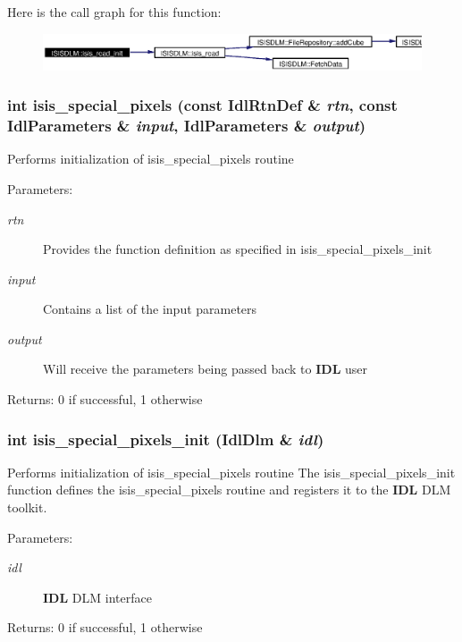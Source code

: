 Here is the call graph for this function:\begin{figure}[H]
\begin{center}
\leavevmode
\includegraphics[width=337pt]{namespaceISISDLM_a26_cgraph}
\end{center}
\end{figure}
\subsubsection{\setlength{\rightskip}{0pt plus 5cm}int isis\_\-special\_\-pixels (const Idl\-Rtn\-Def \& {\em rtn}, const Idl\-Parameters \& {\em input}, Idl\-Parameters \& {\em output})}\label{namespaceISISDLM_a35}


Performs initialization of isis\_\-special\_\-pixels routine \begin{Desc}
\item[Parameters:]
\begin{description}
\item[{\em rtn}]Provides the function definition as specified in isis\_\-special\_\-pixels\_\-init \item[{\em input}]Contains a list of the input parameters \item[{\em output}]Will receive the parameters being passed back to {\bf IDL} user \end{description}
\end{Desc}
\begin{Desc}
\item[Returns:]0 if successful, 1 otherwise \end{Desc}
\subsubsection{\setlength{\rightskip}{0pt plus 5cm}int isis\_\-special\_\-pixels\_\-init (Idl\-Dlm \& {\em idl})}\label{namespaceISISDLM_a34}


Performs initialization of isis\_\-special\_\-pixels routine The isis\_\-special\_\-pixels\_\-init function defines the isis\_\-special\_\-pixels routine and registers it to the {\bf IDL} DLM toolkit. \begin{Desc}
\item[Parameters:]
\begin{description}
\item[{\em idl}]{\bf IDL} DLM interface \end{description}
\end{Desc}
\begin{Desc}
\item[Returns:]0 if successful, 1 otherwise \end{Desc}


